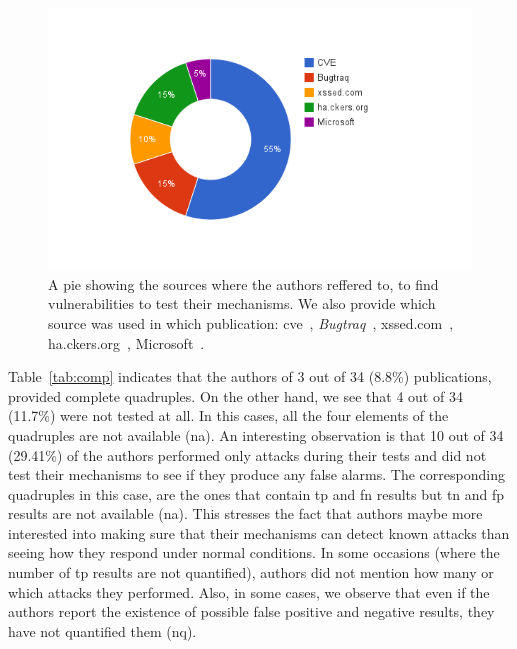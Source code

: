 \documentclass[conference]{IEEEtran}
\begin{document}
\begin{figure}
\begin{center}
\leavevmode
\includegraphics[scale=0.47]{defect-percentages.png}
\end{center}
\caption{\label{fig:defect_sources}A pie showing the sources
where the authors reffered to, to find vulnerabilities to test
their mechanisms. We also provide which source was used
in which publication:
{\sc cve}~\cite{XBS06,NLC07,VFJKKV07,PMP11,BK04,BV08,JB07,SMS13,WPLKK09,JKK06a,PS11},
{\it Bugtraq}~\cite{PB05,KKVJ06,JEP08},
{\sc xss}ed.com~\cite{NSS06,APKLM10},
ha.ckers.org~\cite{TNH07,PSC09,LV09},
Microsoft~\cite{RDWDE07}.}
\end{figure}

Table~\ref{tab:comp} indicates that the authors of 3 out of 34
(8.8\%) publications, provided complete quadruples.
On the other hand, we see that 4 out of
34 (11.7\%) were not tested at all.
In this cases, all the four elements of the
quadruples are not available ({\sc na}).
An interesting observation is that 10 out of 34
(29.41\%) of the authors performed only attacks
during their tests and did not test their mechanisms
to see if they produce any false alarms. The corresponding
quadruples in this case, are the ones that contain {\sc tp} and
{\sc fn} results but {\sc tn} and {\sc fp} results are not
available ({\sc na}). This stresses the fact that authors
maybe more interested into making sure that
their mechanisms can detect known attacks than seeing how
they respond under normal conditions.
In some occasions (where the number of {\sc tp} results
are not quantified), authors did not mention how many or
which attacks they performed.
Also, in some cases, we observe that even if
the authors report the existence of possible
false positive and negative results, they have not
quantified them ({\sc nq}).
\end{document}
